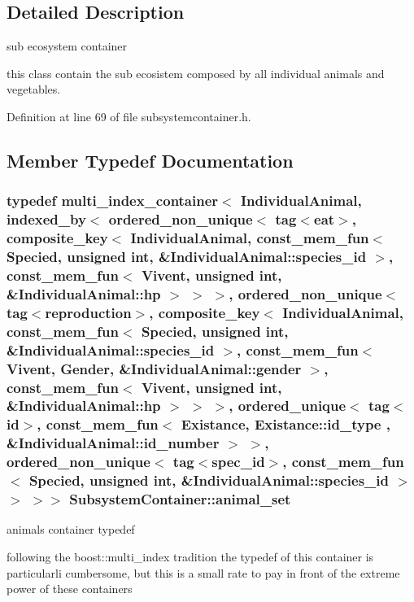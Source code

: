 \subsection{Detailed Description}
sub ecosystem container 

this class contain the sub ecosistem composed by all individual animals and vegetables. 

Definition at line 69 of file subsystemcontainer.h.



\subsection{Member Typedef Documentation}
\hypertarget{classSubsystemContainer_a8f87e58293188f19a139b1f9ac21fe3e}{
\subsubsection[{animal\_\-set}]{\setlength{\rightskip}{0pt plus 5cm}typedef multi\_\-index\_\-container$<$ {\bf IndividualAnimal}, indexed\_\-by$<$ ordered\_\-non\_\-unique$<$ tag$<${\bf eat}$>$, composite\_\-key$<$ {\bf IndividualAnimal}, const\_\-mem\_\-fun$<$ {\bf Specied}, unsigned int, \&IndividualAnimal::species\_\-id $>$, const\_\-mem\_\-fun$<$ {\bf Vivent}, unsigned int, \&IndividualAnimal::hp $>$ $>$ $>$, ordered\_\-non\_\-unique$<$ tag$<${\bf reproduction}$>$, composite\_\-key$<$ {\bf IndividualAnimal}, const\_\-mem\_\-fun$<$ {\bf Specied}, unsigned int, \&IndividualAnimal::species\_\-id $>$, const\_\-mem\_\-fun$<$ {\bf Vivent}, {\bf Gender}, \&IndividualAnimal::gender $>$, const\_\-mem\_\-fun$<$ {\bf Vivent}, unsigned int, \&IndividualAnimal::hp $>$ $>$ $>$, ordered\_\-unique$<$ tag$<${\bf id}$>$, const\_\-mem\_\-fun$<$ {\bf Existance}, {\bf Existance::id\_\-type} , \&IndividualAnimal::id\_\-number $>$ $>$, ordered\_\-non\_\-unique$<$ tag$<${\bf spec\_\-id}$>$, const\_\-mem\_\-fun$<$ {\bf Specied}, unsigned int, \&IndividualAnimal::species\_\-id $>$ $>$ $>$$>$ {\bf SubsystemContainer::animal\_\-set}}}
\label{classSubsystemContainer_a8f87e58293188f19a139b1f9ac21fe3e}


animals container typedef 

following the boost::multi\_\-index tradition the typedef of this container is particularli cumbersome, but this is a small rate to pay in front of the extreme power of these containers

